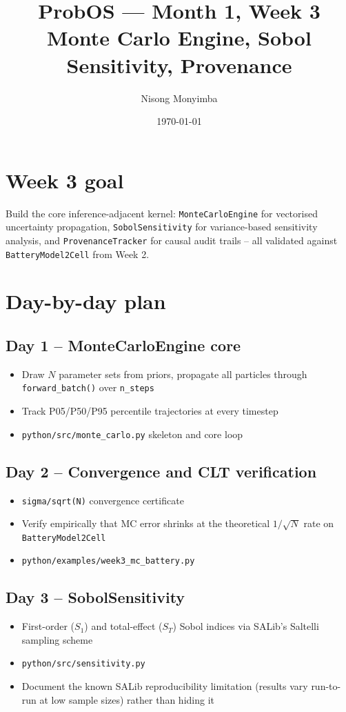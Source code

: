 \documentclass[11pt]{article}
\title{ProbOS --- Month 1, Week 3\\Monte Carlo Engine, Sobol Sensitivity, Provenance}
\author{Nisong Monyimba}
\date{\today}
\begin{document}
\maketitle

\section*{Week 3 goal}
Build the core inference-adjacent kernel: \texttt{MonteCarloEngine} for
vectorised uncertainty propagation, \texttt{SobolSensitivity} for
variance-based sensitivity analysis, and \texttt{ProvenanceTracker} for
causal audit trails -- all validated against \texttt{BatteryModel2Cell}
from Week 2.

\section*{Day-by-day plan}

\subsection*{Day 1 -- MonteCarloEngine core}
\begin{itemize}[leftmargin=*]
  \item Draw $N$ parameter sets from priors, propagate all particles
    through \texttt{forward\_batch()} over \texttt{n\_steps}
  \item Track P05/P50/P95 percentile trajectories at every timestep
  \item \texttt{python/src/monte\_carlo.py} skeleton and core loop
\end{itemize}

\subsection*{Day 2 -- Convergence and CLT verification}
\begin{itemize}[leftmargin=*]
  \item \texttt{sigma/sqrt(N)} convergence certificate
  \item Verify empirically that MC error shrinks at the theoretical
    $1/\sqrt{N}$ rate on \texttt{BatteryModel2Cell}
  \item \texttt{python/examples/week3\_mc\_battery.py}
\end{itemize}

\subsection*{Day 3 -- SobolSensitivity}
\begin{itemize}[leftmargin=*]
  \item First-order ($S_1$) and total-effect ($S_T$) Sobol indices via
    SALib's Saltelli sampling scheme
  \item \texttt{python/src/sensitivity.py}
  \item Document the known SALib reproducibility limitation (results
    vary run-to-run at low sample sizes) rather than hiding it
\end{itemize}
\end{document}
